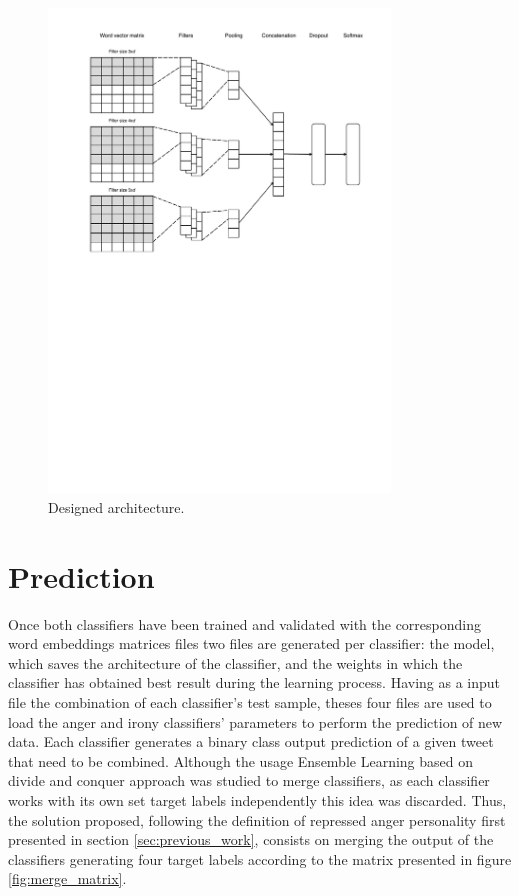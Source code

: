 \begin{figure}[!htp]
  \center
  \includegraphics[width=0.81\textwidth]{figures/designed_architecture}
  \caption{Designed architecture.}
  \label{fig:designed_architecture}
\end{figure}

\section{Prediction}

Once both classifiers have been trained and validated with the corresponding word embeddings matrices files two files are generated per classifier: the model, which saves the architecture of the classifier, and the weights in which the classifier has obtained best result during the learning process. Having as a input file the combination of each classifier's test sample, theses four files are used to load the anger and irony classifiers' parameters to perform the prediction of new data. Each classifier generates a binary class output prediction of a given tweet that need to be combined. Although the usage Ensemble Learning based on divide and conquer \cite{ensemble2009Polikar} approach was studied to merge classifiers, as each classifier works with its own set target labels independently this idea was discarded. Thus, the solution proposed, following the definition of repressed anger personality first presented in section \ref{sec:previous_work}, consists on merging the output of the classifiers generating four target labels according to the matrix presented in figure \ref{fig:merge_matrix}.

